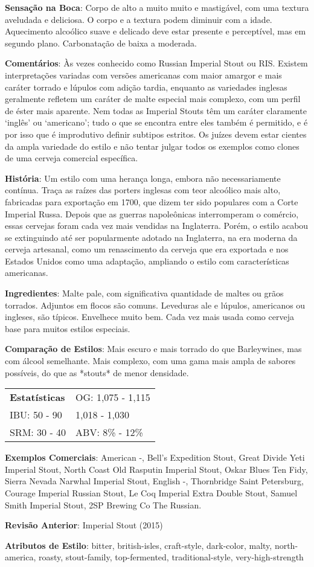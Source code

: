 \textbf{Sensação na Boca}: Corpo de alto a muito muito e mastigável, com uma textura aveludada e deliciosa. O corpo e a textura podem diminuir com a idade. Aquecimento alcoólico suave e delicado deve estar presente e perceptível, mas em segundo plano. Carbonatação de baixa a moderada.

\textbf{Comentários}: Às vezes conhecido como Russian Imperial Stout ou RIS. Existem interpretações variadas com versões americanas com maior amargor e mais caráter torrado e lúpulos com adição tardia, enquanto as variedades inglesas geralmente refletem um caráter de malte especial mais complexo, com um perfil de éster mais aparente. Nem todas as Imperial Stouts têm um caráter claramente ‘inglês’ ou ‘americano’; tudo o que se encontra entre eles também é permitido, e é por isso que é improdutivo definir subtipos estritos. Os juízes devem estar cientes da ampla variedade do estilo e não tentar julgar todos os exemplos como clones de uma cerveja comercial específica.

\textbf{História}: Um estilo com uma herança longa, embora não necessariamente contínua. Traça as raízes das porters inglesas com teor alcoólico mais alto, fabricadas para exportação em 1700, que dizem ter sido populares com a Corte Imperial Russa. Depois que as guerras napoleônicas interromperam o comércio, essas cervejas foram cada vez mais vendidas na Inglaterra. Porém, o estilo acabou se extinguindo até ser popularmente adotado na Inglaterra, na era moderna da cerveja artesanal, como um renascimento da cerveja que era exportada e nos Estados Unidos como uma adaptação, ampliando o estilo com características americanas.

\textbf{Ingredientes}: Malte pale, com significativa quantidade de maltes ou grãos torrados. Adjuntos em flocos são comuns. Leveduras ale e lúpulos, americanos ou ingleses, são típicos. Envelhece muito bem. Cada vez mais usada como cerveja base para muitos estilos especiais.

\textbf{Comparação de Estilos}: Mais escuro e mais torrado do que Barleywines, mas com álcool semelhante. Mais complexo, com uma gama mais ampla de sabores possíveis, do que as *stouts* de menor densidade.

\begin{tabular}{@{}p{35mm}p{35mm}@{}}
  \textbf{Estatísticas} & OG: 1,075 - 1,115 \\
  IBU: 50 - 90  & 1,018 - 1,030 \\
  SRM: 30 - 40  & ABV: 8\% - 12\%
\end{tabular}

\textbf{Exemplos Comerciais}: American -, Bell's Expedition Stout, Great Divide Yeti Imperial Stout, North Coast Old Rasputin Imperial Stout, Oskar Blues Ten Fidy, Sierra Nevada Narwhal Imperial Stout, English -, Thornbridge Saint Petersburg, Courage Imperial Russian Stout, Le Coq Imperial Extra Double Stout, Samuel Smith Imperial Stout, 2SP Brewing Co The Russian.

\textbf{Revisão Anterior}: Imperial Stout (2015)

\textbf{Atributos de Estilo}: bitter, british-isles, craft-style, dark-color, malty, north-america, roasty, stout-family, top-fermented, traditional-style, very-high-strength
